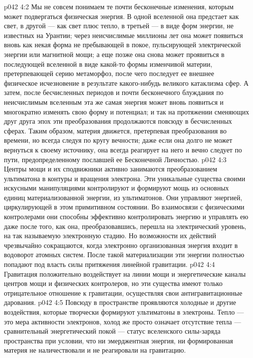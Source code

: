 \vs p042 4:2 Мы не совсем понимаем те почти бесконечные изменения, которым может подвергаться физическая энергия. В одной вселенной она предстает как свет, в другой --- как свет плюс тепло, в третьей --- в виде форм энергии, не известных на Урантии; через неисчислимые миллионы лет она может появиться вновь как некая форма не пребывающей в покое, пульсирующей электрической энергии или магнитной мощи; а еще позже она снова может проявиться в последующей вселенной в виде какой\hyp{}то формы изменчивой материи, претерпевающей серию метаморфоз, после чего последует ее внешнее физическое исчезновение в результате какого\hyp{}нибудь великого катаклизма сфер. А затем, после бесчисленных периодов и почти бесконечного блуждания по неисчислимым вселенным эта же самая энергия может вновь появиться и многократно изменять свою форму и потенциал; и так на протяжении сменяющих друг друга эпох эти преобразования продолжаются повсюду в бесчисленных сферах. Таким образом, материя движется, претерпевая преобразования во времени, но всегда следуя по кругу вечности; даже если она долго не может вернуться к своему источнику, она всегда реагирует на него и вечно следует по пути, предопределенному пославшей ее Бесконечной Личностью.
\vs p042 4:3 Центры мощи и их сподвижники активно занимаются преобразованием ультиматона в контуры и вращения электрона. Эти уникальные существа своими искусными манипуляциями контролируют и формируют мощь из основных единиц материализованной энергии, из ультиматонов. Они управляют энергией, циркулирующей в этом примитивном состоянии. Во взаимосвязи с физическими контролерами они способны эффективно контролировать энергию и управлять ею даже после того, как она, преобразовавшись, перешла на электрический уровень, на так называемую электронную стадию. Но возможности их действий чрезвычайно сокращаются, когда электронно организованная энергия входит в водоворот атомных систем. После такой материализации эти энергии полностью попадают под власть силы притяжения линейной гравитации.
\vs p042 4:4 Гравитация положительно воздействует на линии мощи и энергетические каналы центров мощи и физических контролеров, но эти существа имеют только отрицательное отношение к гравитации, осуществляя свои антигравитационные дарования.
\vs p042 4:5 Повсюду в пространстве проявляются холодные и другие воздействия, которые творчески формируют ультиматоны в электроны. Тепло --- это мера активности электронов, холод же просто означает отсутствие тепла --- сравнительный энергетический покой --- статус вселенского силы\hyp{}заряда пространства при условии, что ни эмерджентная энергия, ни формированная материя не наличествовали и не реагировали на гравитацию.
